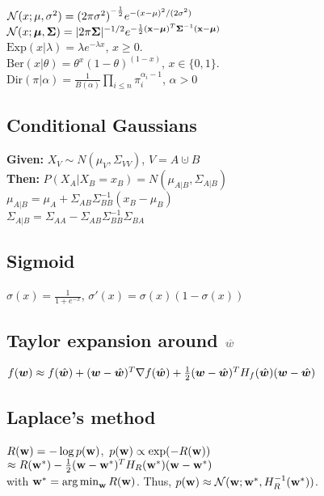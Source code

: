 $\mathcal{N}(x;\mu, \sigma^2)={(2\pi\sigma^2)}^{-\frac{1}{2}}e^{-(x-\mu)^2/(2\sigma^2)}$\\
$\mathcal{N}(x;\bm{\mu}, \bm{\Sigma})= |2\pi\bm{\Sigma}|^{-1/2} e^{-\frac{1}{2}(\mathbf{x}-\bm{\mu})^T\bm{\Sigma}^{-1}(\mathbf{x}-\bm{\mu})} $\\
$\mathrm{Exp}(x|\lambda){=}\lambda e^{-\lambda x}$, $x\geq0$.\\ $\mathrm{Ber}(x|\theta){=}\theta^x (1{-}\theta)^{(1-x)}$, $x\in\{0,1\}$.\\
$\mathrm{Dir}(\pi|\alpha) = \frac{1}{B(\alpha)}\prod_{i\leq n}\pi_i^{\alpha_i-1}$, $\alpha>0$
\subsection*{Conditional Gaussians}
\textbf{Given:} $X_V \sim N(\mu_V, \Sigma_{VV})$, $V=A\cupdot B$\\
\textbf{Then:} $P(X_A|X_B=x_B)=N(\mu_{A|B}, \Sigma_{A|B})$\\
$\mu_{A|B}=\mu_A+\Sigma_{AB}\Sigma^{-1}_{BB}(x_B-\mu_B)$\\
$\Sigma_{A|B}=\Sigma_{AA}-\Sigma_{AB}\Sigma^{-1}_{BB}\Sigma_{BA}$

\subsection*{Sigmoid}
$\sigma(x)=\frac{1}{1+e^{-x}}$, $\sigma'(x)=\sigma(x)(1-\sigma(x))$

\subsection*{Taylor expansion {\color{gray} around $\color{gray}\hat\vw$}}
$f({\bm{w}}) \approx f(\hat{{\bm{w}}}) + ({\bm{w}} - \hat{{\bm{w}}})^T \nabla f(\hat{{\bm{w}}}) + \frac{1}{2}({\bm{w}}-\hat{{\bm{w}}})^TH_f(\hat{{\bm{w}}})({\bm{w}}-\hat{{\bm{w}}})$

\subsection*{Laplace's method}
\mbox{$R({\mathbf{w}}) = -\log p({\mathbf{w}})$, $p({\mathbf{w}}) \propto \exp(-R({\mathbf{w}}))$}\\ $\approx R({\mathbf{w}}^*) - \frac{1}{2}({\mathbf{w}}-{\mathbf{w}}^*)^TH_R({\mathbf{w}}^*)({\mathbf{w}}-{\mathbf{w}}^*)$\\ with ${\mathbf{w}}^* = \operatorname*{arg\,min}_{\mathbf{w}} R({\mathbf{w}})$. Thus, $p({\mathbf{w}}) \approx \mathcal{N}({\mathbf{w}};{\mathbf{w}}^*, H_R^{-1}({\mathbf{w}}^*))$.



